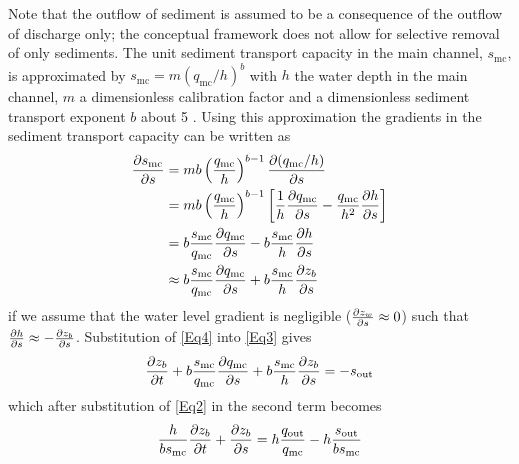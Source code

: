 Note that the outflow of sediment is assumed to be a consequence of the outflow of discharge only; the conceptual framework does not allow for selective removal of only sediments.	
The unit sediment transport capacity in the main channel, $s_\text{mc}$, is approximated by $s_\text{mc} = m \left ( q_\text{mc} / h \right )^b$ with $h$ the water depth \unitbrackets{\SI{}{\metre}} in the main channel, $m$ a dimensionless calibration factor and a dimensionless sediment transport exponent $b$ about 5 \citep{Engelundh67}.
Using this approximation the gradients in the sediment transport capacity can be written as
%
\begin{align}
\pdiff{s_\text{mc}}{s} &= m b \left ( \frac{q_\text{mc}}{h} \right )^{b-1} \pdiff{(q_\text{mc} / h)}{s} \\
&= m b \left ( \frac{q_\text{mc}}{h} \right )^{b-1} \left [ \frac{1}{h} \pdiff{q_\text{mc}}{s} - \frac{q_\text{mc}}{h^2} \pdiff{h}{s} \right ] \\
&= b \frac{s_\text{mc}}{q_\text{mc}} \pdiff{q_\text{mc}}{s} - b \frac{s_\text{mc}}{h} \pdiff{h}{s} \\
&\approx b \frac{s_\text{mc}}{q_\text{mc}} \pdiff{q_\text{mc}}{s} + b \frac{s_\text{mc}}{h} \pdiff{z_b}{s}
\label{Eq4}
\end{align}
%
if we assume that the water level gradient is negligible ($\pdiff{z_w}{s} \approx 0$) such that $\pdiff{h}{s} \approx -\pdiff{z_b}{s}$.
Substitution of \autoref{Eq4} into \autoref{Eq3} gives
%
\begin{equation}
\pdiff{z_b}{t} + b \frac{s_\text{mc}}{q_\text{mc}} \pdiff{q_\text{mc}}{s} + b \frac{s_\text{mc}}{h} \pdiff{z_b}{s} = -s_\text{out}
\label{Eq5a}
\end{equation}
%
which after substitution of \autoref{Eq2} in the second term becomes
%
\begin{equation}
\frac{h}{b s_\text{mc}} \pdiff{z_b}{t} + \pdiff{z_b}{s} = h \frac{q_\text{out}}{q_\text{mc}} - h \frac{s_\text{out}}{b s_\text{mc}}
\label{Eq5}
\end{equation}


